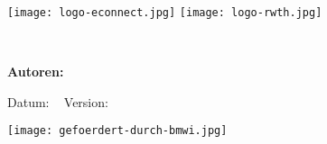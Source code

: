\begin{titlepage}

\texttt{[image: logo-econnect.jpg]}
\hfill \texttt{[image: logo-rwth.jpg]}

\vspace{4em}

{\huge\bfseries \thistitle} \\

\vspace{4em}

{\Large\bfseries Autoren: \thisauthor}

\vspace{4em}

Datum: \thisdate ~ Version: \thisversion

\vspace{4em}

\thisabstract

\vspace{4em}
\hfill \texttt{[image: gefoerdert-durch-bmwi.jpg]}


\end{titlepage}